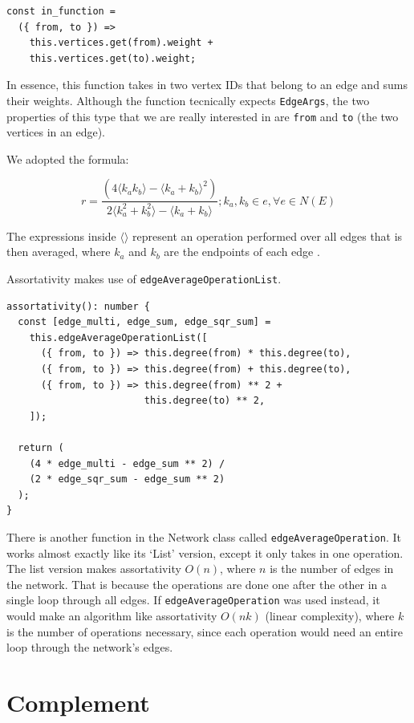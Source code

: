 \begin{verbatim}
const in_function =
  ({ from, to }) =>
    this.vertices.get(from).weight +
    this.vertices.get(to).weight;
\end{verbatim}

In essence, this function takes in two vertex IDs that belong to an edge and sums their weights.
Although the function tecnically expects \texttt{EdgeArgs},
the two properties of this type that we are really interested in are \texttt{from}
and \texttt{to} (the two vertices in an edge).

We adopted the formula:

$$r=\frac{(4\langle k_a k_b\rangle-\langle k_a+k_b\rangle^2)}{2\langle k_a^2+k_b^2\rangle-\langle k_a+k_b\rangle}; k_a, k_b \in e, \forall e \in N(E)$$

The expressions inside $\langle$$\rangle$ represent
an operation performed over all edges
that is then averaged,
where $k_a$ and $k_b$ are the endpoints of each edge \cite{ref:barrenas}.

Assortativity makes use of \texttt{edgeAverageOperationList}.

\begin{verbatim}
assortativity(): number {
  const [edge_multi, edge_sum, edge_sqr_sum] =
    this.edgeAverageOperationList([
      ({ from, to }) => this.degree(from) * this.degree(to),
      ({ from, to }) => this.degree(from) + this.degree(to),
      ({ from, to }) => this.degree(from) ** 2 +
                        this.degree(to) ** 2,
    ]);

  return (
    (4 * edge_multi - edge_sum ** 2) /
    (2 * edge_sqr_sum - edge_sum ** 2)
  );
}
\end{verbatim}

There is another function in the Network class called \texttt{edgeAverageOperation}.
It works almost exactly like its `List' version, except it only takes in one operation.
The list version makes assortativity $O(n)$, where $n$ is the number of edges in the network.
That is because the operations are done one after the other in a single loop through all edges.
If \texttt{edgeAverageOperation} was used instead, it would make an algorithm like assortativity $O(nk)$ (linear complexity),
where $k$ is the number of operations necessary, since each operation would need an entire loop through the network's edges.

\section{Complement}

